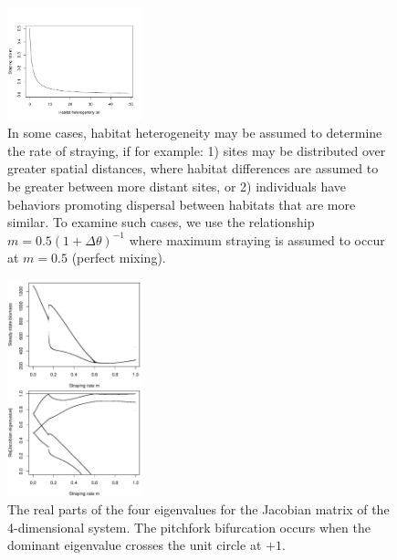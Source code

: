 \documentclass{revtex4}
\begin{document}
\begin{figure}
  \captionsetup{justification=raggedright,
singlelinecheck=false
}
\centering
\includegraphics[width=0.35\textwidth]{fig_mthetarelation.pdf}
\caption{
In some cases, habitat heterogeneity may be assumed to determine the rate of straying, if for example:
1) sites may be distributed over greater spatial distances, where habitat differences are assumed to be greater between more distant sites, or 2) individuals have behaviors promoting dispersal between habitats that are more similar. To examine such cases, we use the relationship $m= 0.5(1 + \Delta\theta)^{-1}$ where maximum straying is assumed to occur at $m=0.5$ (perfect mixing).
} \label{fig:mthetarelation}
\end{figure}

\begin{figure}
  \captionsetup{justification=raggedright,
singlelinecheck=false
}
\centering
\includegraphics[width=0.35\textwidth]{fig_eigs.pdf}
\caption{
The real parts of the four eigenvalues for the Jacobian matrix of the 4-dimensional system.
The pitchfork bifurcation occurs when the dominant eigenvalue crosses the unit circle at $+1$. 
} \label{fig:eigs}
\end{figure}
\end{document}
